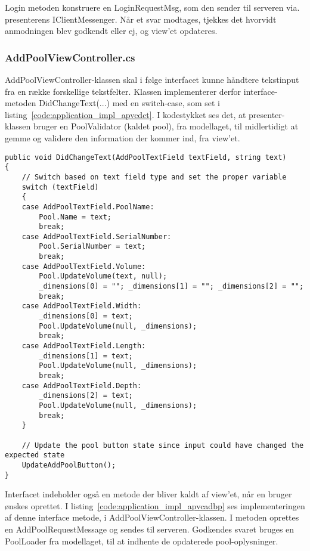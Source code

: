 Login metoden konstruere en LoginRequestMsg, som den sender til serveren via. presenterens IClientMessenger. Når et svar modtages, tjekkes det hvorvidt anmodningen blev godkendt eller ej, og view'et opdateres.

\subsubsection{AddPoolViewController.cs}
AddPoolViewController-klassen skal i følge interfacet kunne håndtere tekstinput fra en række forskellige tekstfelter. Klassen implementerer derfor interface-metoden DidChangeText(...) med en switch-case, som set i listing~\ref{code:application_impl_apvcdct}. I kodestykket ses det, at presenter-klassen bruger en PoolValidator (kaldet pool), fra modellaget, til midlertidigt at gemme og validere den information der kommer ind, fra view'et.

\begin{lstlisting}[caption={DidChangeText(...)},label={code:application_impl_apvcdct}]
public void DidChangeText(AddPoolTextField textField, string text)
{
	// Switch based on text field type and set the proper variable
	switch (textField)
	{
	case AddPoolTextField.PoolName:
		Pool.Name = text;
		break;
	case AddPoolTextField.SerialNumber:
		Pool.SerialNumber = text;
		break;
	case AddPoolTextField.Volume:
		Pool.UpdateVolume(text, null);
		_dimensions[0] = ""; _dimensions[1] = ""; _dimensions[2] = "";
		break;
	case AddPoolTextField.Width:
		_dimensions[0] = text;
		Pool.UpdateVolume(null, _dimensions);
		break;
	case AddPoolTextField.Length:
		_dimensions[1] = text;
		Pool.UpdateVolume(null, _dimensions);
		break;
	case AddPoolTextField.Depth:
		_dimensions[2] = text;
		Pool.UpdateVolume(null, _dimensions);
		break;
	}

	// Update the pool button state since input could have changed the expected state
	UpdateAddPoolButton();
}
\end{lstlisting}

Interfacet indeholder også en metode der bliver kaldt af view'et, når en bruger ønskes oprettet. I listing~\ref{code:application_impl_apvcadbp} ses implementeringen af denne interface metode, i AddPoolViewController-klassen. I metoden oprettes en AddPoolRequestMessage og sendes til serveren. Godkendes svaret bruges en PoolLoader fra modellaget, til at indhente de opdaterede pool-oplysninger.

